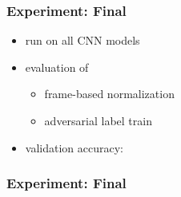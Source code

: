 \begin{frame}
  \frametitle{Experiment: Final}
  \begin{itemize}
    \item run on all CNN models
    \item evaluation of
    \begin{itemize}
     \item frame-based normalization
     \item adversarial label train
    \end{itemize}
    \item validation accuracy:
    \vspace{-0.5cm}
  \begin{figure}[!ht]
    \centering
  \end{figure}
  \end{itemize}
\end{frame}

\begin{frame}
  \frametitle{Experiment: Final}
  \centering \vfill
  
\end{frame}